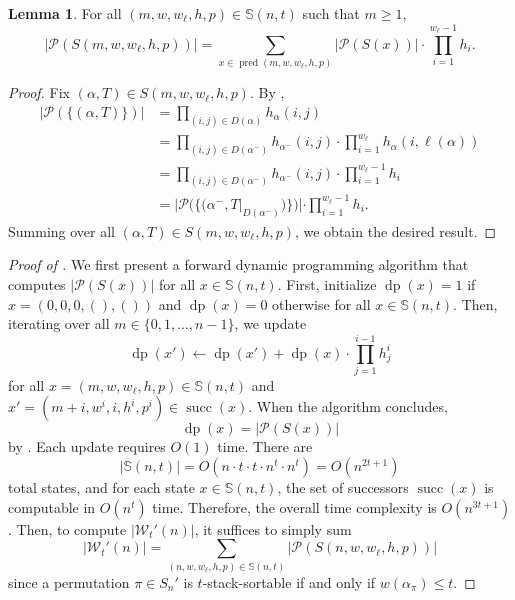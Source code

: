 \documentclass[12pt]{amsart}
\DeclareMathOperator{\dynp}{dp}
\DeclareMathOperator{\successor}{succ}
\DeclareMathOperator{\pred}{pred}
\theoremstyle{definition}
\newtheorem{lemma}[theorem]{Lemma}
\begin{document}
\begin{lemma}\label{lem:recursion}
For all $(m,w,w_{\ell},h,p)\in \mathbb{S}(n,t)$ such that $m\ge 1$,
\[|\mathcal{P}(S(m,w,w_{\ell},h,p))|=\sum_{x\in \pred(m,w,w_{\ell},h,p)}|\mathcal{P}(S(x))|\cdot \prod_{i=1}^{w_{\ell}-1}h_i.\]
\end{lemma}
\begin{proof}
Fix $(\alpha,T)\in S(m,w,w_{\ell},h,p)$. By ,
\begin{align*}
|\mathcal{P}(\{(\alpha,T)\})| &= \prod_{(i,j)\in D(\alpha)}h_\alpha(i,j) \\
&= \prod_{(i,j)\in D(\alpha^-)}h_{\alpha^-}(i,j)\cdot \prod_{i=1}^{w_{\ell}}h_{\alpha}(i,\ell(\alpha)) \\
&= \prod_{(i,j)\in D(\alpha^-)}h_{\alpha^-}(i,j)\cdot \prod_{i=1}^{w_{\ell}-1}h_i \\
&= |\mathcal{P}(\{(\alpha^-,T|_{D(\alpha^-)})\})|\cdot \prod_{i=1}^{w_{\ell}-1}h_i.
\end{align*}
Summing over all $(\alpha,T)\in S(m,w,w_{\ell},h,p)$, we obtain the desired result.
\end{proof}
\begin{proof}[Proof of ]
We first present a forward dynamic programming algorithm that computes $|\mathcal{P}(S(x))|$ for all $x\in \mathbb{S}(n,t)$. First, initialize $\dynp(x)=1$ if $x=(0,0,0,(),())$ and $\dynp(x)=0$ otherwise for all $x\in \mathbb{S}(n,t)$. Then, iterating over all $m\in \{0,1,\dots,n-1\}$, we update 
\[\dynp(x')\leftarrow \dynp(x') + \dynp(x) \cdot \prod_{j=1}^{i-1} h_j^i\]
for all $x=(m,w,w_{\ell},h,p)\in\mathbb{S}(n,t)$ and $x'=(m+i,w^i,i,h^i,p^i)\in \successor(x)$. When the algorithm concludes, \[\dynp(x)=|\mathcal{P}(S(x))|\] by . Each update requires $O(1)$ time. There are \[|\mathbb{S}(n,t)|=O(n\cdot t\cdot t\cdot n^t\cdot n^t)=O(n^{2t+1})\] total states, and for each state $x\in \mathbb{S}(n,t)$, the set of successors $\successor(x)$ is computable in $O(n^t)$ time. Therefore, the overall time complexity is $O(n^{3t+1})$. Then, to compute $|\mathcal{W}_t'(n)|$, it suffices to simply sum
\[|\mathcal{W}_t'(n)|=\sum_{(n,w,w_{\ell},h,p)\in\mathbb{S}(n,t)} |\mathcal{P}(S(n,w,w_{\ell},h,p))|\]
since a permutation $\pi\in S_n'$ is $t$-stack-sortable if and only if $w(\alpha_{\pi})\le t$.
\end{proof}
\end{document}
